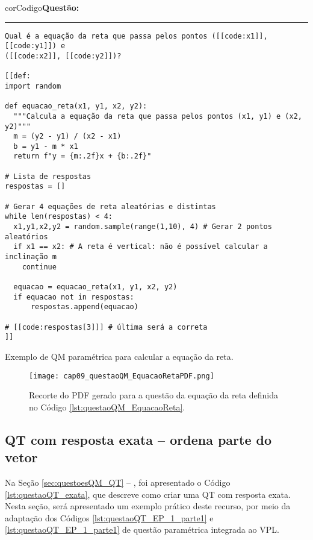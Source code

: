 \begin{listing}[!ht]
\begin{myboxCode}{corCodigo}{\textbf{Questão: }}\vspace{3mm}
\hrule
\begin{verbatim}
Qual é a equação da reta que passa pelos pontos ([[code:x1]], [[code:y1]]) e 
([[code:x2]], [[code:y2]])?

[[def: 
import random

def equacao_reta(x1, y1, x2, y2):
  """Calcula a equação da reta que passa pelos pontos (x1, y1) e (x2, y2)"""
  m = (y2 - y1) / (x2 - x1)
  b = y1 - m * x1
  return f"y = {m:.2f}x + {b:.2f}"

# Lista de respostas
respostas = []

# Gerar 4 equações de reta aleatórias e distintas
while len(respostas) < 4:
  x1,y1,x2,y2 = random.sample(range(1,10), 4) # Gerar 2 pontos aleatórios
  if x1 == x2: # A reta é vertical: não é possível calcular a inclinação m
    continue

  equacao = equacao_reta(x1, y1, x2, y2)
  if equacao not in respostas:
      respostas.append(equacao)
        
# [[code:respostas[3]]] # última será a correta
]]
\end{verbatim}
\end{myboxCode}
\caption{Exemplo de QM paramétrica para calcular a equação da reta.}
\label{lst:questaoQM_EquacaoReta}
\end{listing}

\begin{figure}[!ht]
  \texttt{[image: cap09\_questaoQM\_EquacaoRetaPDF.png]}
  \caption{Recorte do PDF gerado para a questão da equação da reta definida no Código \ref{lst:questaoQM_EquacaoReta}.}
  \label{fig:cap09_questaoQM_EquacaoRetaPDF}
\end{figure}

\subsection{QT com resposta exata -- ordena parte do vetor}

Na Seção \ref{sec:questoesQM_QT} -- , foi apresentado o Código \ref{lst:questaoQT_exata}, que descreve como criar uma QT com resposta exata. Nesta seção, será apresentado um exemplo prático deste recurso, por meio da adaptação dos Códigos \ref{lst:questaoQT_EP_1_parte1} e \ref{lst:questaoQT_EP_1_parte1} de questão paramétrica integrada ao VPL.

